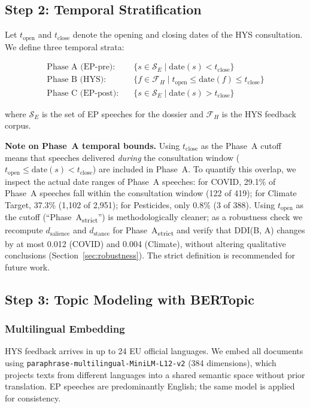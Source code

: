 \documentclass[sigconf,natbib]{acmart}
\begin{document}
\subsection{Step 2: Temporal Stratification}

Let $t_{\text{open}}$ and $t_{\text{close}}$ denote the opening and closing dates of the
HYS consultation. We define three temporal strata:

\begin{align}
\text{Phase A (EP-pre):}   &\quad \{s \in \mathcal{S}_E \mid \text{date}(s) < t_{\text{close}}\} \\
\text{Phase B (HYS):}      &\quad \{f \in \mathcal{F}_H \mid t_{\text{open}} \leq \text{date}(f) \leq t_{\text{close}}\} \\
\text{Phase C (EP-post):}  &\quad \{s \in \mathcal{S}_E \mid \text{date}(s) > t_{\text{close}}\}
\end{align}

where $\mathcal{S}_E$ is the set of EP speeches for the dossier and $\mathcal{F}_H$ is the
HYS feedback corpus.

\noindent\textbf{Note on Phase~A temporal bounds.}
Using $t_{\text{close}}$ as the Phase~A cutoff means that speeches delivered \emph{during}
the consultation window ($t_{\text{open}} \leq \text{date}(s) < t_{\text{close}}$) are
included in Phase~A. To quantify this overlap, we inspect the actual date ranges of Phase~A
speeches: for COVID, 29.1\% of Phase~A speeches fall within the consultation window
(122 of 419); for Climate Target, 37.3\% (1,102 of 2,951); for Pesticides, only 0.8\%
(3 of 388). Using $t_{\text{open}}$ as the cutoff (``Phase~A\textsubscript{strict}'')
is methodologically cleaner; as a robustness check we recompute $d_{\text{salience}}$ and
$d_{\text{stance}}$ for Phase~A\textsubscript{strict} and verify that DDI(B, A) changes by
at most 0.012 (COVID) and 0.004 (Climate), without altering qualitative conclusions
(Section~\ref{sec:robustness}). The strict definition is recommended for future work.

\subsection{Step 3: Topic Modeling with BERTopic}

\subsubsection{Multilingual Embedding}

HYS feedback arrives in up to 24 EU official languages. We embed all documents using
\texttt{paraphrase-multilingual-MiniLM-L12-v2} (384 dimensions), which projects texts from
different languages into a shared semantic space without prior translation. EP speeches are
predominantly English; the same model is applied for consistency.
\end{document}

